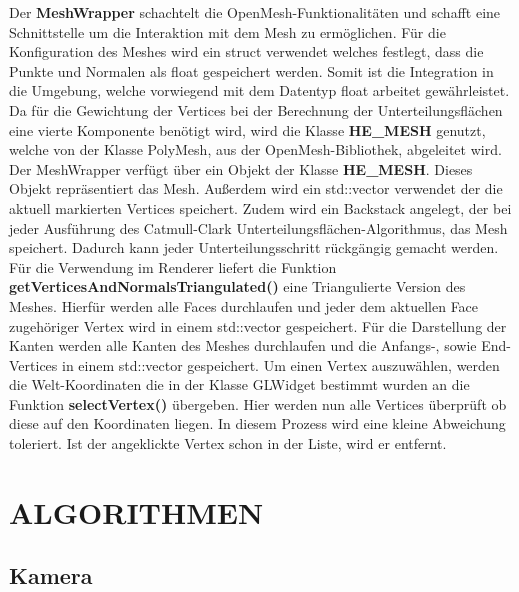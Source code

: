 \noindent Der \textbf{MeshWrapper} schachtelt die OpenMesh-Funktionalitäten und schafft eine Schnittstelle um die Interaktion mit dem Mesh zu ermöglichen. Für die Konfiguration des Meshes wird ein struct verwendet welches festlegt, dass die Punkte und Normalen als float gespeichert werden. Somit ist die Integration in die Umgebung, welche vorwiegend mit dem Datentyp float arbeitet gewährleistet. Da für die Gewichtung der Vertices bei der Berechnung der Unterteilungsflächen eine vierte Komponente benötigt wird, wird die Klasse \textbf{HE\_MESH} genutzt, welche von der Klasse PolyMesh, aus der OpenMesh-Bibliothek, abgeleitet wird.\newline
Der MeshWrapper verfügt über ein Objekt der Klasse \textbf{HE\_MESH}. Dieses Objekt repräsentiert das Mesh. Außerdem wird ein std::vector verwendet der die aktuell markierten Vertices speichert. Zudem wird ein Backstack angelegt, der bei jeder Ausführung des Catmull-Clark Unterteilungsflächen-Algorithmus, das Mesh speichert. Dadurch kann jeder Unterteilungsschritt rückgängig gemacht werden.\newline
Für die Verwendung im Renderer liefert die Funktion \textbf{getVerticesAndNormalsTriangulated()} eine Triangulierte Version des Meshes. Hierfür werden alle Faces durchlaufen und jeder dem aktuellen Face zugehöriger Vertex wird in einem std::vector gespeichert.\newline
Für die Darstellung der Kanten werden alle Kanten des Meshes durchlaufen und die Anfangs-, sowie End-Vertices in einem std::vector gespeichert.\newline
Um einen Vertex auszuwählen, werden die Welt-Koordinaten die in der Klasse GLWidget bestimmt wurden an die Funktion \textbf{selectVertex()} übergeben. Hier werden nun alle Vertices überprüft ob diese auf den Koordinaten liegen. In diesem Prozess wird eine kleine Abweichung toleriert. Ist der angeklickte Vertex schon in der Liste, wird er entfernt.
		
	\newpage
	\section{\Large ALGORITHMEN}
	
	\subsection{Kamera}
	
